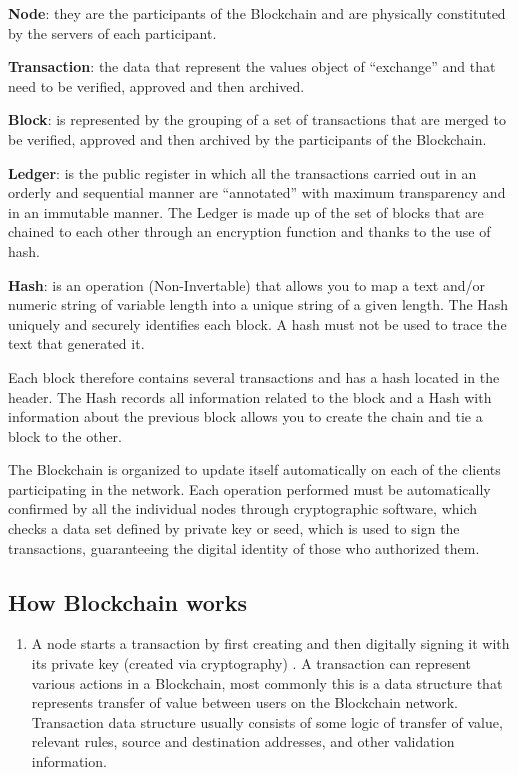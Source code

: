 \documentclass[11pt]{article}
\providecommand{\tightlist}{%
      \setlength{\itemsep}{0pt}\setlength{\parskip}{0pt}}
\begin{document}
    \textbf{Node}: they are the participants of the Blockchain and are
physically constituted by the servers of each participant.

    \textbf{Transaction}: the data that represent the values object of
``exchange'' and that need to be verified, approved and then archived.

    \textbf{Block}: is represented by the grouping of a set of transactions
that are merged to be verified, approved and then archived by the
participants of the Blockchain.

    \textbf{Ledger}: is the public register in which all the transactions
carried out in an orderly and sequential manner are ``annotated'' with
maximum transparency and in an immutable manner. The Ledger is made up
of the set of blocks that are chained to each other through an
encryption function and thanks to the use of hash.

    \textbf{Hash}: is an operation (Non-Invertable) that allows you to map a
text and/or numeric string of variable length into a unique string of a
given length. The Hash uniquely and securely identifies each block. A
hash must not be used to trace the text that generated it.

    Each block therefore contains several transactions and has a hash
located in the header. The Hash records all information related to the
block and a Hash with information about the previous block allows you to
create the chain and tie a block to the other.

    The Blockchain is organized to update itself automatically on each of
the clients participating in the network. Each operation performed must
be automatically confirmed by all the individual nodes through
cryptographic software, which checks a data set defined by private key
or seed, which is used to sign the transactions, guaranteeing the
digital identity of those who authorized them.

    \hypertarget{how-blockchain-works}{%
\subsection{How Blockchain works}\label{how-blockchain-works}}

    \begin{enumerate}
\def\labelenumi{\arabic{enumi}.}
\tightlist
\item
  A node starts a transaction by first creating and then digitally
  signing it with its private key (created via cryptography) . A
  transaction can represent various actions in a Blockchain, most
  commonly this is a data structure that represents transfer of value
  between users on the Blockchain network. Transaction data structure
  usually consists of some logic of transfer of value, relevant rules,
  source and destination addresses, and other validation information.
\end{enumerate}
\end{document}
